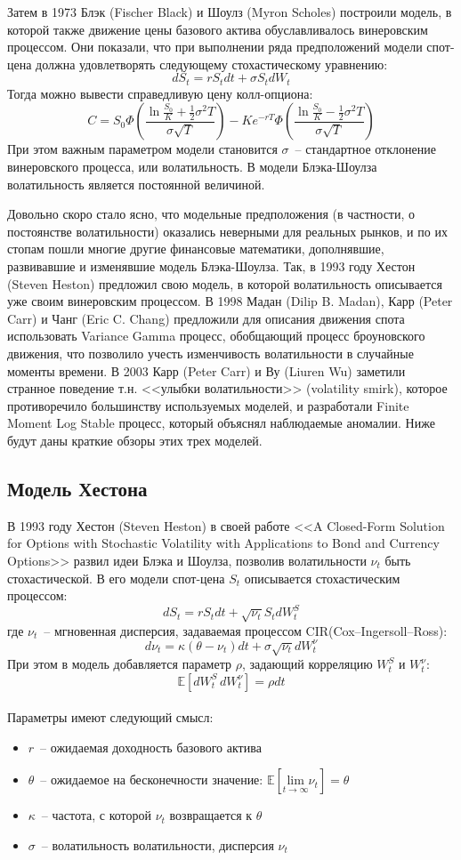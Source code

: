 \documentclass[oneside, final, 12pt, a4paper]{article}
\begin{document}
Затем в 1973 Блэк (Fischer Black) и Шоулз (Myron Scholes) построили модель, в которой также движение цены базового актива обуславливалось винеровским процессом. Они показали, что при выполнении ряда предположений модели спот-цена должна удовлетворять следующему стохастическому уравнению:
\[ dS_t = r S_t dt + \sigma S_t dW_t \]
Тогда можно вывести справедливую цену колл-опциона:
\[
C=S_0\Phi\left(\frac{\ln{\frac{S_0}{K}}+\frac{1}{2}\sigma^2T}{\sigma\sqrt{T}}\right)-Ke^{-rT}\Phi\left(\frac{\ln{\frac{S_0}{K}}-\frac{1}{2}\sigma^2T}{\sigma\sqrt{T}}\right)
\]
При этом важным параметром модели становится $\sigma$~-- стандартное отклонение винеровского процесса, или волатильность. В модели Блэка-Шоулза волатильность является постоянной величиной. \par
Довольно скоро стало ясно, что модельные предположения (в частности, о постоянстве волатильности) оказались неверными для реальных рынков, и по их стопам пошли многие другие финансовые математики, дополнявшие, развивавшие и изменявшие модель Блэка-Шоулза. Так, в 1993 году Хестон (Steven Heston) предложил свою модель, в которой волатильность описывается уже своим винеровским процессом. В 1998 Мадан (Dilip B. Madan), Карр (Peter Carr) и Чанг (Eric C. Chang) предложили для описания движения спота использовать Variance Gamma процесс, обобщающий процесс броуновского движения, что позволило учесть изменчивость волатильности в случайные моменты времени. В 2003 Карр (Peter Carr) и Ву (Liuren Wu) заметили странное поведение т.н. <<улыбки волатильности>> (volatility smirk), которое противоречило большинству используемых моделей, и разработали Finite Moment Log Stable процесс, который объяснял наблюдаемые аномалии. Ниже будут даны краткие обзоры этих трех моделей.

\newpage
\subsection{Модель Хестона}
В 1993 году Хестон (Steven Heston) в своей работе <<A Closed-Form Solution for Options with Stochastic Volatility with Applications to Bond and Currency Options>> развил идеи Блэка и Шоулза, позволив волатильности \(\nu_t\) быть стохастической. В его модели спот-цена $S_t$ описывается стохастическим процессом:
\[dS_t=rS_tdt+\sqrt{\nu_t}S_tdW_t^S\]
где $\nu_t$~-- мгновенная дисперсия, задаваемая процессом CIR(Cox–Ingersoll–Ross):
\[d\nu_t=\kappa(\theta-\nu_t)dt+\sigma\sqrt{\nu_t}dW_t^\nu\]
При этом в модель добавляется параметр $\rho$, задающий корреляцию $W^S_t$ и $W^\nu_t$:
\[\mathbb{E}\left[dW_t^S\, dW_t^\nu\right]=\rho dt\]
\\
Параметры имеют следующий смысл:
\begin{itemize}
\item $r$~-- ожидаемая доходность базового актива
\item $\theta$~-- ожидаемое на бесконечности значение: 
  \( \mathbb{E} \left[\underset{t \rightarrow \infty}{\text{lim}} \nu_t \right] = \theta \)
\item $\kappa$~-- частота, с которой $\nu_t$ возвращается к $\theta$ 
\item $\sigma$~-- волатильность волатильности, дисперсия $\nu_t$
\end{itemize}
\end{document}
